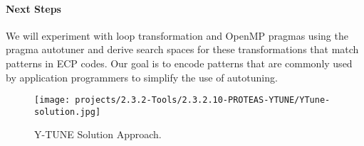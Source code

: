 \paragraph{Next Steps}
We will experiment with loop transformation and OpenMP pragmas using the pragma
autotuner and derive search spaces for these transformations that match
patterns in ECP codes.  Our goal is to encode patterns that are commonly
used by application programmers to simplify the use of autotuning.

\begin{figure}[h]
\begin{center}
\texttt{[image: projects/2.3.2-Tools/2.3.2.10-PROTEAS-YTUNE/YTune-solution.jpg]}
\end{center}
\caption{Y-TUNE Solution Approach.}
\end{figure}

%
